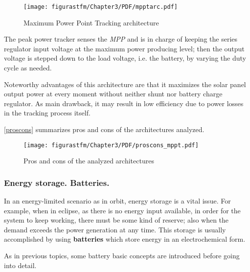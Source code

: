 		\begin{figure} [H] 				
				\centering
				\texttt{[image: figurastfm/Chapter3/PDF/mpptarc.pdf]}
				\caption{Maximum Power Point Tracking architecture \cite{spacecraftspower}} \label{mpptarc}
			\end{figure}
	
	
	The peak power tracker senses the \textit{MPP} and is in charge of keeping the series regulator input voltage at the maximum power producing level; then the output voltage is stepped down to the load voltage,  i.e. the battery, by varying the duty cycle as needed.
	
	Noteworthy advantages of this architecture are that it maximizes the solar panel output power at every moment without neither shunt nor battery charge regulator. As main drawback, it may result in low efficiency due to power losses in the tracking process itself.
	
		\autoref{proscons} summarizes pros and cons of the architectures analyzed. 

	
			\begin{figure} [h] 				
				\centering
				\texttt{[image: figurastfm/Chapter3/PDF/proscons\_mppt.pdf]}
				\caption{Pros and cons of the analyzed architectures \cite{spacecraftspower}} \label{proscons}
			\end{figure}
			
				
\subsubsection{Energy storage. Batteries.} \label{energystr}


In an energy-limited scenario as in orbit, energy storage is a vital issue. For example, when in eclipse, as there is no energy input available, in order for the system to keep working, there must be some kind of reserve; also when the demand exceeds the power generation at
any time. This storage is usually accomplished by using \textbf{batteries} which store energy in an electrochemical form.

As in previous topics, some battery basic concepts are introduced before going into detail.

